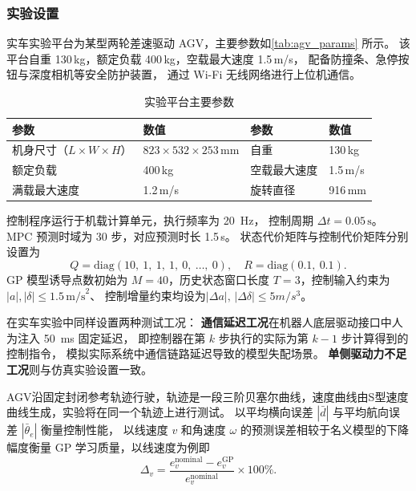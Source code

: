 \subsubsection{实验设置}
\label{subsubsec:exp_setup}
 
实车实验平台为某型两轮差速驱动 AGV，主要参数如\autoref{tab:agv_params} 所示。
该平台自重 130\,kg，额定负载 400\,kg，空载最大速度 1.5\,m/s，
配备防撞条、急停按钮与深度相机等安全防护装置，
通过 Wi-Fi 无线网络进行上位机通信。
 
\begin{table}[htbp]
\centering
\caption{实验平台主要参数}
\label{tab:agv_params}
\begin{tabular}{llll}
    \toprule
    参数 & 数值 & 参数 & 数值 \\
    \midrule
    机身尺寸（$L \times W \times H$） & $823\times532\times253$\,mm
        & 自重         & 130\,kg \\
    额定负载     & 400\,kg
        & 空载最大速度 & 1.5\,m/s \\
    满载最大速度 & 1.2\,m/s
        & 旋转直径     & 916\,mm \\
    \bottomrule
\end{tabular}
\end{table}
 
控制程序运行于机载计算单元，执行频率为 \SI{20}{Hz}，
控制周期 $\Delta t = 0.05\,\text{s}$。
MPC 预测时域为 30 步，对应预测时长 1.5\,s。
状态代价矩阵与控制代价矩阵分别设置为
\begin{equation}
    Q = \mathrm{diag}(10,\ 1,\ 1,\ 1,\ 0,\ \ldots,\ 0),\quad
    R = \mathrm{diag}(0.1,\ 0.1).
\end{equation}
GP 模型诱导点数初始为 $M=40$，历史状态窗口长度 $T=3$，控制输入约束为$|a|,|\delta| \leq 1.5\,\text{m/s}^2$、
控制增量约束均设为$|\Delta a|,\, |\Delta \delta| \leq 5 m/s^3$。
 
在实车实验中同样设置两种测试工况：
\textbf{通信延迟工况}在机器人底层驱动接口中人为注入 \SI{50}{ms} 固定延迟，
即控制器在第 $k$ 步执行的实际为第 $k-1$ 步计算得到的控制指令，
模拟实际系统中通信链路延迟导致的模型失配场景。
\textbf{单侧驱动力不足工况}则与仿真实验设置一致。
 
AGV沿固定封闭参考轨迹行驶，轨迹是一段三阶贝塞尔曲线，速度曲线由S型速度曲线生成，实验将在同一个轨迹上进行测试。
以平均横向误差 $|\bar{d}|$ 与平均航向误差 $|\bar{\theta}_e|$ 衡量控制性能，
以线速度 $v$ 和角速度 $\omega$ 的预测误差相较于名义模型的下降幅度衡量 GP
学习质量，以线速度为例即
\begin{equation}
    \Delta_v = \frac{e_v^{\mathrm{nominal}} - e_v^{\mathrm{GP}}}
               {e_v^{\mathrm{nominal}}} \times 100\%.
\end{equation}

